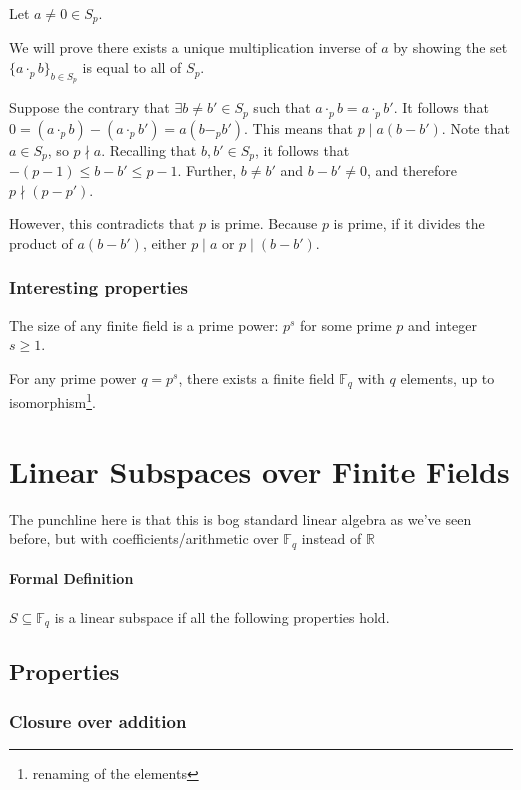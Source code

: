 \documentclass{idc_msc}
\newcommand{\Fq}{{\mathbb{F}_q}}
\begin{document}
Let \(a \ne 0 \in S_p\).

We will prove there exists a unique multiplication inverse of \(a\) by showing the set \(\{a \cdot_p b\}_{b \in S_p}\) is equal to all of \(S_p\).

Suppose the contrary that \(\exists b \ne b' \in S_p\) such that \(a \cdot_p b= a \cdot_p b'\).
It follows that \(0 = (a \cdot_p b) - (a \cdot_p b') = a (b -_p b')\).
This means that \( p \mid a (b - b')\). Note that \(a \in S_p\), so \(p \nmid a\).
Recalling that \(b, b' \in S_p\), it follows that \(-(p-1) \le b - b' \le p-1\).
Further, \(b \ne b'\) and \(b - b' \ne 0\), and therefore \(p \nmid (p - p')\).

However, this contradicts that \(p\) is prime.
Because \(p\) is prime, if it divides the product of \(a (b - b')\), either \(p \mid a\) or \(p \mid (b - b')\).

\subsubsection{Interesting properties}

The size of any finite field is a prime power: \(p^s\) for some prime \(p\) and integer \(s \ge 1\).

For any prime power \(q=p^s\), there exists a  finite field \(\Fq\) with \(q\) elements, up to isomorphism\footnote{renaming of the elements}.

\section{Linear Subspaces over Finite Fields}

The punchline here is that this is bog standard linear algebra as we've seen before, but with coefficients/arithmetic over \(\Fq\) instead of \(\mathbb{R}\)

\paragraph{Formal Definition}

\(S \subseteq \Fq\) is a linear subspace if all the following properties hold.

\subsection{Properties}

\subsubsection{Closure over addition}
\end{document}
